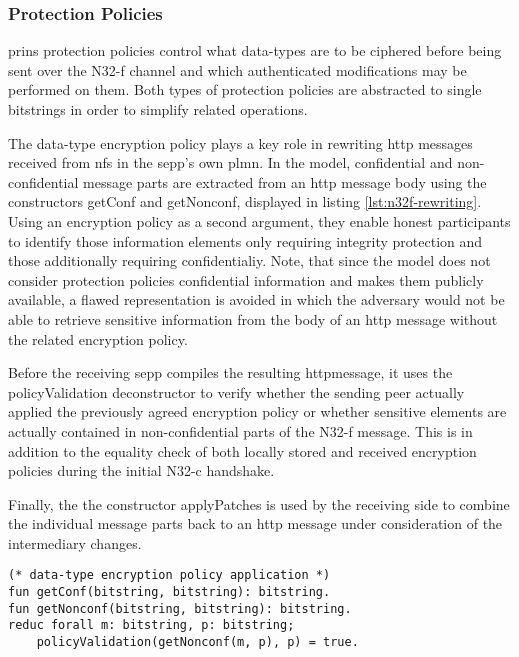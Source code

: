 \subsubsection{Protection Policies}

\gls{prins} protection policies control what data-types are to be ciphered before being sent over the N32-f channel and which authenticated modifications may be performed on them.
Both types of protection policies are abstracted to single bitstrings in order to simplify related operations.

The data-type encryption policy plays a key role in rewriting \gls{http} messages received from \glspl{nf} in the \gls{sepp}'s own \gls{plmn}.
In the model, confidential and non-confidential message parts are extracted from an \gls{http} message body using the constructors {\sffamily getConf} and {\sffamily getNonconf}, displayed in listing \ref{lst:n32f-rewriting}.
Using an encryption policy as a second argument, they enable honest participants to identify those information elements only requiring integrity protection and those additionally requiring confidentialiy.
Note, that since the model does not consider protection policies confidential information and makes them publicly available, a flawed representation is avoided in which the adversary would not be able to retrieve sensitive information from the body of an \gls{http} message without the related encryption policy.

Before the receiving \gls{sepp} compiles the resulting \gls{http}message, it uses the {\sffamily policyValidation} deconstructor to verify whether the sending peer actually applied the previously agreed encryption policy or whether sensitive elements are actually contained in non-confidential parts of the N32-f message.
This is in addition to the equality check of both locally stored and received encryption policies during the initial N32-c handshake.

Finally, the the constructor {\sffamily applyPatches} is used by the receiving side to combine the individual message parts back to an \gls{http} message under consideration of the intermediary changes.

\begin{lstlisting}[caption={N32-f message rewriting},label={lst:n32f-rewriting},firstnumber=105]
(* data-type encryption policy application *)
fun getConf(bitstring, bitstring): bitstring.
fun getNonconf(bitstring, bitstring): bitstring.
reduc forall m: bitstring, p: bitstring;
    policyValidation(getNonconf(m, p), p) = true.
\end{lstlisting}

